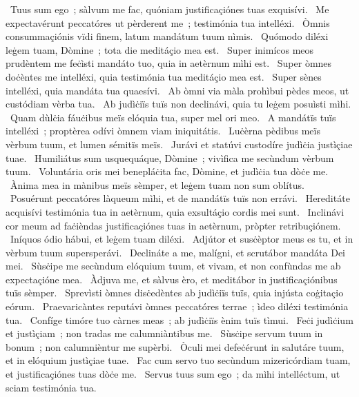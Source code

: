 {~Tuus sum ego~; sàlvum me fac, quóniam justificaçiónes tuas exquisívi. 
~Me expectavérunt peccatóres ut pèrderent me~; testimónia tua intelléxi. 
~Òmnis consummaçiónis vïdi finem, latum mandátum tuum nìmis. 
~Quómodo diléxi leġem tuam, Dòmine~; tota die meditáçio mea est. 
~Super inimícos meos prudèntem me feċìsti mandáto tuo, quia in aetèrnum mìhi est. 
~Super òmnes doċèntes me intelléxi, quia testimónia tua meditáçio mea est. 
~Super sènes intelléxi, quia mandáta tua quaesívi. 
~Ab òmni via màla prohìbui pèdes meos, ut custódiam vèrba tua. 
~Ab judìċiïs tuïs non declinávi, quia tu leġem posuìsti mìhi. 
~Quam dùlċia fáuċibus meïs elóquia tua, super mel ori meo. 
~A mandátïs tuïs intelléxi~; proptèrea odívi òmnem viam iniquitátis. 
~Luċèrna pèdibus meïs vèrbum tuum, et lumen sémitïs meïs. 
~Jurávi et statúvi custodíre judìċia justìçiae tuae. 
~Humiliátus sum usquequáque, Dòmine~; vivìfica me secùndum vèrbum tuum. 
~Voluntária oris mei benepláċita fac, Dòmine, et judìċia tua dòċe me. 
~Ànima mea in mànibus meïs sèmper, et leġem tuam non sum oblítus. 
~Posuérunt peccatóres làqueum mìhi, et de mandátïs tuïs non errávi. 
~Hereditáte acquisívi testimónia tua in aetèrnum, quia exsultáçio cordis mei sunt. 
~Inclinávi cor meum ad faċièndas justificaçiónes tuas in aetèrnum, pròpter retribuçiónem. 
~Iníquos ódio hábui, et leġem tuam diléxi. 
~Adjútor et susċèptor meus es tu, et in vèrbum tuum supersperávi. 
~Declináte a me, malígni, et scrutábor mandáta Dei mei. 
~Sùsċipe me secùndum elóquium tuum, et vivam, et non confùndas me ab expectaçióne mea. 
~Àdjuva me, et sàlvus èro, et meditábor in justificaçiónibus tuïs sèmper. 
~Sprevìsti òmnes disċedèntes ab judìċiïs tuïs, quia injústa coġitaçio eórum. 
~Praevaricàntes reputávi òmnes peccatóres terrae~; ìdeo diléxi testimónia tua. 
~Confíge timóre tuo càrnes meas~; ab judìċiïs ènim tuïs tìmui. 
~Feċi judìċium et justìçiam~; non tradas me calumniàntibus me. 
~Sùsċipe servum tuum in bonum~; non calumnièntur me supèrbi. 
~Òculi mei defeċérunt in salutáre tuum, et in elóquium justìçiae tuae. 
~Fac cum servo tuo secùndum mizericórdiam tuam, et justificaçiónes tuas dòċe me. 
~Servus tuus sum ego~; da mìhi intelléctum, ut sciam testimónia tua. 
}
